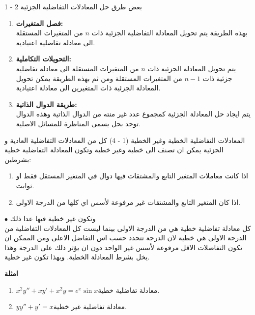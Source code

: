 	\begin{frame}
		\begin{exampleblock}{1 - 2 بعض طرق حل المعادلات التفاضلية الجزئية}
			\begin{enumerate}
				\item \textbf{فصل المتغيرات:}\\ بهذه الطريقة يتم تحويل المعادلة التفاضلية الجزئية ذات $n$ من المتغيرات المستقلة الى معادلة تفاضلية اعتيادية.
				
				\item \textbf{التحويلات التكاملية:}\\ يتم تحويل المعادلة الجزئية ذات $n$ من المتغيرات المستقلة الى معادلة تفاضلية جزئية ذات $n-1$ من المتغيرات المستقلة ومن ثم بهذه الطريقة يمكن تحويل المعادلة الجزئية ذات المتغيرين الى معادلة اعتيادية.
				
				\item \textbf{طريقة الدوال الذاتية: }\\ يتم ايجاد حل المعادلة الجزئية كمجموع عدد غير منته من الدوال الذاتية وهذه الدوال توجد بحل يسمى المناظرة للمسائل الاصلية.
			\end{enumerate}
		\end{exampleblock}
	\end{frame}
	
	\begin{frame}
		\begin{exampleblock}{المعادلات التفاضلية الخطية وغير الخطية (1 - 4)}
			كل من المعادلات التفاضلية العادية و الجزئية يمكن ان تصنف الى خطية وغير خطية وتكون المعادلة التفاضلية خطية بشرطين:
			\begin{enumerate}
				\item اذا كانت معاملات المتغير التابع والمشتقات فيها دوال في المتغير المستقل فقط او ثوابت.
				
				\item اذا كان المتغير التابع والمشتقات غير مرفوعة لأسس اي كلها من الدرجة الاولى.
			\end{enumerate}  
			\noindent
			$\bullet$ وتكون غير خطية فيها عدا ذلك
			\\[10pt]
			كل معادلة تفاضلية خطية هي من الدرجة الاولى بينما ليست كل المعادلات التفاضلية من الدرجة الاولى هي خطية لان الدرجة تتحدد حسب اس التفاضل الاعلى ومن الممكن ان تكون التفاضلات الاقل مرفوعة لأسس غير الواحد دون ان يؤثر ذلك على الدرجة وهذا يخل بشرط المعادلة الخطية. وبهذا تكون غير خطية.
		\end{exampleblock}
		
		\begin{exampleblock}{\textbf{امثلة}}
			\begin{enumerate}
				\item $x^2 y'' + xy' + x^2 y = e^x \sin x$\qquad معادلة تفاضلية خطية.
				\item $yy'' + y' = x$\qquad\qquad\qquad\quad معادلة تفاضلية غير خطية.
			\end{enumerate}
		\end{exampleblock}
	\end{frame}
	
